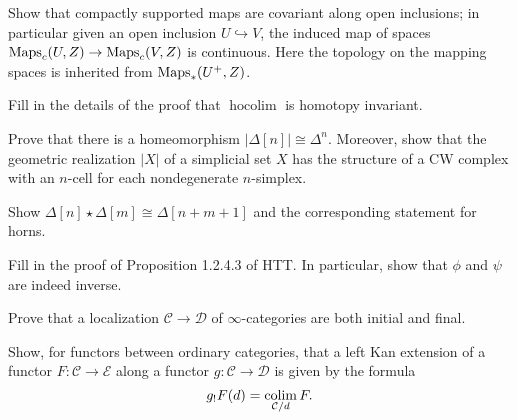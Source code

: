 \documentclass{amsart}
\DeclareMathOperator{\hocolim}{hocolim}
\begin{document}
\begin{exercise}
    Show that compactly supported maps are covariant along open inclusions; in particular given an
    open inclusion $U\hookrightarrow V$, the induced map of spaces
    $\operatorname{Maps}_c(U,Z)\to \operatorname{Maps}_c(V,Z)$ is continuous. Here the topology on the mapping spaces is
    inherited from $\operatorname{Maps}_*(U^+,Z)$.
\end{exercise}

\begin{exercise}
    Fill in the details of the proof that $\hocolim$ is homotopy invariant.
\end{exercise}

\begin{exercise}
    Prove that there is a homeomorphism $|\Delta[n]|\cong \Delta^n$. Moreover, show that
    the geometric realization $|X|$ of a simplicial set $X$ has the structure of a CW
    complex with an $n$-cell for each nondegenerate $n$-simplex.
\end{exercise}

\begin{exercise}
    Show $\Delta[n]\star \Delta[m]\cong \Delta[n+m+1]$ and the corresponding statement
    for horns.
\end{exercise}

\begin{exercise}
    Fill in the proof of Proposition 1.2.4.3 of HTT. In particular, show that $\phi$ and
    $\psi$ are indeed inverse.
\end{exercise}

\begin{exercise}
    Prove that a localization $\mathcal{C}\to \mathcal{D}$ of $\infty$-categories are
    both initial and final.
\end{exercise}

\begin{exercise}
    Show, for functors between ordinary categories, that a left Kan extension of a
    functor $F:\mathcal{C}\to \mathcal{E}$ along a functor $g:\mathcal{C}\to \mathcal{D}$
    is given by the formula
    \begin{equation*}
        g_!F(d) = \operatorname*{colim}_{\mathcal{C}/d} F.
    \end{equation*}
\end{exercise}


\newpage




\end{document}
